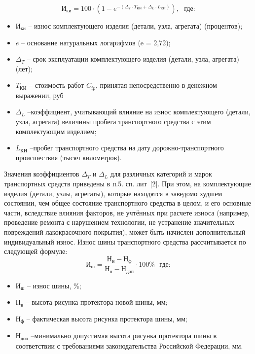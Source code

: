 %
\begin{equation}\label{eq:I}
\text{И}_{\text{ки}} 
= 100\cdot\left( 1-e^ {-\left( \Delta_{T} \cdot T_{\text{КИ}} + \Delta_{L} \cdot L_{\text{КИ}} \right)}\right), \,\,\,\,\text{где:}   
\end{equation}
%
\begin{itemize}
	\item[ ]$ \text{И}_{\text{ки}} $ -- износ комплектующего изделия (детали, узла, агрегата) (процентов); 
	\item[ ]$ e $ -- основание натуральных логарифмов (e =  2,72);
	\item[ ]$ \Delta_{T}$ --  срок эксплуатации комплектующего изделия (детали, узла, агрегата) (лет);
	\item[ ]$ T_{\text{КИ}} $ -- стоимость работ $ C_{ip} $, принятая непосредственно в денежном выражении, руб
	\item[ ]$ \Delta_{L} $ --коэффициент, учитывающий влияние на износ комплектующего (детали, узла, агрегата) величины пробега транспортного средства с этим комплектующим изделием;
	\item[ ]$ L_{\text{КИ}} $ --пробег транспортного средства на дату дорожно-транспортного происшествия (тысяч километров).  
		\end{itemize}
\vspace{5mm}
\par Значения коэффициентов $ \Delta_{T}$  и $ \Delta_{L} $  для различных категорий и марок транспортных средств приведены в п.5. сп. лит~[2]. При этом, на комплектующие изделия (детали, узлы, агрегаты), которые находятся в заведомо худшем состоянии, чем общее состояние транспортного средства в целом, и его основные части, вследствие влияния факторов, не учтённых при расчете износа (например, проведение ремонта с нарушением технологии, не устранение значительных повреждений лакокрасочного покрытия), может быть начислен дополнительный индивидуальный износ. 
Износ шины транспортного средства рассчитывается по следующей формуле:
\begin{equation}\label{eq:sh}
\text{И}_{\text{ш}} = \frac{\text{Н}_{\text{н}}-\text{Н}_{\text{ф}}}{\text{Н}_{\text{н}}-\text{Н}_{\text{доп}}} \cdot{100}\%  \,\,\,\,\text{где:} 
\end{equation}
%
\begin{itemize}
	\item[ ] $ \text{И}_{\text{ш}} $ -- износ шины, \%;
	\item[ ] $ \text{Н}_{\text{н}} $ -- высота рисунка протектора новой шины, мм;
	\item[ ] $\text{Н}_{\text{ф}} $ -- фактическая высота рисунка протектора шины, мм;
	\item[ ] $ \text{Н}_{\text{доп}} $ --минимально допустимая высота рисунка протектора шины в соответствии с требованиями законодательства Российской Федерации, мм.
\end{itemize}
